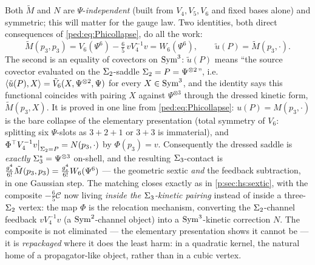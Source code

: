 Both $\tilde M$ and $N$ are $\Psi$-\emph{independent} (built from $V_4,V_5,V_6$ and fixed
bases alone) and symmetric; this will matter for the gauge law. Two identities, both direct
consequences of \eqref{ped:eq:Phicollapse}, do all the work:
\begin{equation}
	\tilde M(p_3,p_3)
	= V_6(\Psi^6)-\tfrac65\,vV_4^{-1}v
	= W_6(\Psi^6),
	\qquad
	\tilde u(P)=\tilde M(p_3,\cdot).
	\label{ped:eq:tildecollapse}
\end{equation}
The second is an equality of covectors on $\operatorname{Sym}^3$: $\tilde u(P)$ means \enquote{the
source covector evaluated on the $\Sigma_2$-saddle $\Sigma_2=P=\Psi^{\otimes2}$}, i.e.\
$\left \langle \tilde u(P),X \right \rangle=\tilde V_6(X,\Psi^{\otimes2},\Psi)$ for every $X\in\operatorname{Sym}^3$, and the
identity says this functional coincides with pairing $X$ against $\Psi^{\otimes3}$
through the dressed kinetic form, $\tilde M(p_3,X)$. It is proved in one line from
\eqref{ped:eq:Phicollapse}: $u(P)=M(p_3,\cdot)$ is the bare collapse of the elementary presentation (total symmetry of
$V_6$: splitting six $\Psi$-slots as $3{+}2{+}1$ or $3{+}3$ is immaterial), and
$\Phi^\top V_4^{-1}v\big|_{\Sigma_2=P}=N(p_3,\cdot)$ by $\Phi(p_3)=v$. Consequently the
dressed saddle is \emph{exactly} $\Sigma_3^*=\Psi^{\otimes3}$ on-shell, and the resulting
$\Sigma_3$-contact is $\tfrac{g_s^4}{6!}\tilde M(p_3,p_3)=\tfrac{g_s^4}{6!}W_6(\Psi^6)$ ---
the geometric sextic \emph{and} the feedback subtraction, in one Gaussian step. The
matching closes exactly as in \cref{p:sec:hs:sextic}, with the composite
$-\tfrac65\mathcal C$ now living \emph{inside the $\Sigma_3$-kinetic pairing} instead of
inside a three-$\Sigma_2$ vertex: the map $\Phi$ is the relocation mechanism, converting the
$\Sigma_2$-channel feedback $vV_4^{-1}v$ (a $\operatorname{Sym}^2$-channel object) into a $\operatorname{Sym}^3$-kinetic
correction $N$. The composite is not eliminated --- the elementary presentation shows it cannot be ---
it is \emph{repackaged} where it does the least harm: in a quadratic kernel, the natural
home of a propagator-like object, rather than in a cubic vertex.

